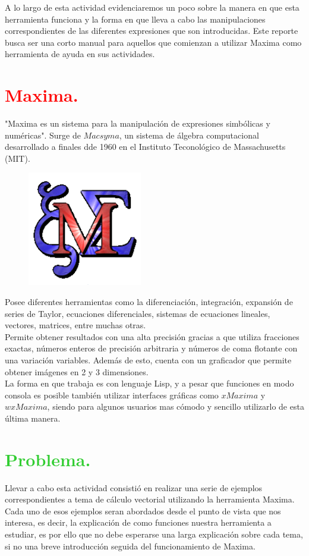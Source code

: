 \documentclass[12pt]{article}
\begin{document}
  A lo largo de esta actividad evidenciaremos un poco sobre la manera en que esta herramienta funciona y la forma en que lleva a cabo las manipulaciones correspondientes de las diferentes expresiones que son introducidas. Este reporte busca ser una corto manual para aquellos que comienzan a utilizar Maxima como herramienta de ayuda en sus actividades.
 
\section*{\textcolor{Red}{Maxima.}}
"Maxima es un sistema para la manipulación de expresiones simbólicas y numéricas". Surge de $Macsyma$, un sistema de álgebra computacional desarrollado a finales dde 1960 en el Instituto Teconológico de Massachusetts (MIT).\\
\begin{figure}
	\begin{center}
      \includegraphics[width=5.0cm]{Maximalogo.png}
    \end{center}
\end{figure}

 Posee diferentes herramientas como la diferenciación, integración, expansión de series de Taylor, ecuaciones diferenciales, sistemas de ecuaciones lineales, vectores, matrices, entre muchas otras.\\

 Permite obtener resultados con una alta precisión gracias a que utiliza fracciones exactas, números enteros de precisión arbitraria y números de coma flotante con una variación variables. Además de esto, cuenta con un graficador que permite obtener imágenes en 2 y 3 dimensiones.\\

 La forma en que trabaja es con lenguaje Lisp, y a pesar que funciones en modo consola es posible también utilizar interfaces gráficas como $xMaxima$ y $wxMaxima$, siendo para algunos usuarios mas cómodo y sencillo utilizarlo de esta última manera.
\pagebreak
\section*{\textcolor{LimeGreen}{Problema.}}
 Llevar a cabo esta actividad consistió en realizar una serie de ejemplos correspondientes a tema de cálculo vectorial utilizando la herramienta Maxima. Cada uno de esos ejemplos seran abordados desde el punto de vista que nos interesa, es decir, la explicación de como funciones nuestra herramienta a estudiar, es por ello que no debe esperarse una larga explicación sobre cada tema, si no una breve introducción seguida del funcionamiento de Maxima.\\
\end{document}

